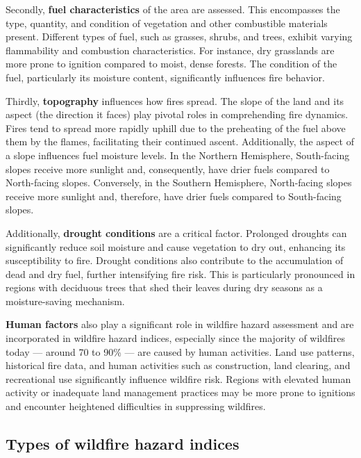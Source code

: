 \documentclass[
  12 pt,
]{Nemilov}
\begin{document}
Secondly, \textbf{fuel characteristics} of the area are assessed. This encompasses the type, quantity, and condition of vegetation and other combustible materials present. Different types of fuel, such as grasses, shrubs, and trees, exhibit varying flammability and combustion characteristics. For instance, dry grasslands are more prone to ignition compared to moist, dense forests. The condition of the fuel, particularly its moisture content, significantly influences fire behavior.

Thirdly, \textbf{topography} influences how fires spread. The slope of the land and its aspect (the direction it faces) play pivotal roles in comprehending fire dynamics. Fires tend to spread more rapidly uphill due to the preheating of the fuel above them by the flames, facilitating their continued ascent. Additionally, the aspect of a slope influences fuel moisture levels. In the Northern Hemisphere, South-facing slopes receive more sunlight and, consequently, have drier fuels compared to North-facing slopes. Conversely, in the Southern Hemisphere, North-facing slopes receive more sunlight and, therefore, have drier fuels compared to South-facing slopes.

Additionally, \textbf{drought conditions} are a critical factor. Prolonged droughts can significantly reduce soil moisture and cause vegetation to dry out, enhancing its susceptibility to fire. Drought conditions also contribute to the accumulation of dead and dry fuel, further intensifying fire risk. This is particularly pronounced in regions with deciduous trees that shed their leaves during dry seasons as a moisture-saving mechanism.

\textbf{Human factors} also play a significant role in wildfire hazard assessment and are incorporated in wildfire hazard indices, especially since the majority of wildfires today --- around 70 to 90\% \citep{robinne2021impacts} --- are caused by human activities. Land use patterns, historical fire data, and human activities such as construction, land clearing, and recreational use significantly influence wildfire risk. Regions with elevated human activity or inadequate land management practices may be more prone to ignitions and encounter heightened difficulties in suppressing wildfires.

\subsection{Types of wildfire hazard indices}\label{types-of-wildfire-hazard-indices}
\end{document}
